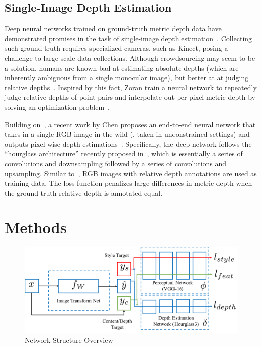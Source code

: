 \documentclass[10pt,twocolumn,letterpaper]{article}
\begin{document}
\subsection{Single-Image Depth Estimation}

Deep neural networks trained on ground-truth metric depth data have demonstrated promises in the task of single-image depth estimation~\cite{liu2015deep,eigen2015predicting,li2015depth,wang2015towards}. Collecting such ground truth requires specialized cameras, such as Kinect, posing a challenge to large-scale data collections. Although crowdsourcing may seem to be a solution, humans are known bad at estimating absolute depths (which are inherently ambiguous from a single monocular image), but better at at judging relative depths~\cite{todd2003visual}. Inspired by this fact, Zoran \etal train a neural network to repeatedly judge relative depths of point pairs and interpolate out per-pixel metric depth by solving an optimization problem~\cite{zoran2015learning}.

Building on~\cite{zoran2015learning}, a recent work by Chen \etal proposes an end-to-end neural network that takes in a single RGB image in the wild (\ie, taken in unconstrained settings) and outputs pixel-wise depth estimations~\cite{chen2016single}. Specifically, the deep network follows the ``hourglass architecture'' recently proposed in~\cite{newell2016stacked}, which is essentially a series of convolutions and downsampling followed by a series of convolutions and upsampling. Similar to~\cite{zoran2015learning}, RGB images with relative depth annotations are used as training data. The loss function penalizes large differences in metric depth when the ground-truth relative depth is annotated equal.

\section{Methods}

\begin{figure}[h]
\centering
\includegraphics[scale=0.4]{network_structure.pdf}
\caption{Network Structure Overview}
\label{fig:overview}
\end{figure}
\end{document}

